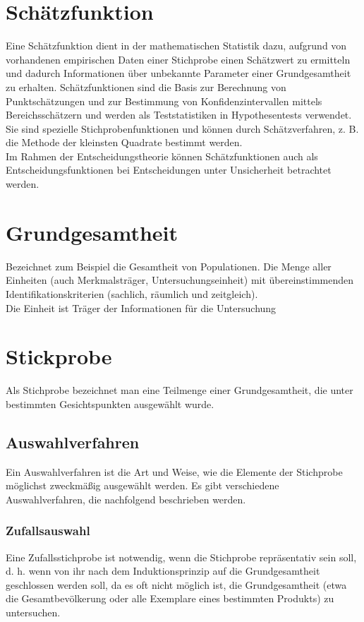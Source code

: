 \section{Schätzfunktion}
Eine Schätzfunktion dient in der mathematischen Statistik dazu, aufgrund von vorhandenen empirischen Daten einer Stichprobe einen Schätzwert zu ermitteln und dadurch Informationen über unbekannte Parameter einer Grundgesamtheit zu erhalten. Schätzfunktionen sind die Basis zur Berechnung von Punktschätzungen und zur Bestimmung von Konfidenzintervallen mittels Bereichsschätzern und werden als Teststatistiken in Hypothesentests verwendet. Sie sind spezielle Stichprobenfunktionen und können durch Schätzverfahren, z. B. die Methode der kleinsten Quadrate  bestimmt werden.\\
Im Rahmen der Entscheidungstheorie können Schätzfunktionen auch als Entscheidungsfunktionen bei Entscheidungen unter Unsicherheit betrachtet werden.

\section{Grundgesamtheit}
Bezeichnet zum Beispiel die Gesamtheit von Populationen.
Die Menge aller Einheiten (auch Merkmalsträger, Untersuchungseinheit) mit übereinstimmenden Identifikationskriterien
(sachlich, räumlich und zeitgleich). \\
Die Einheit ist Träger der Informationen für die Untersuchung

\section{Stickprobe}
Als Stichprobe bezeichnet man eine Teilmenge einer Grundgesamtheit, die unter bestimmten Gesichtspunkten ausgewählt wurde.
\subsection{Auswahlverfahren}
Ein Auswahlverfahren ist die Art und Weise, wie die Elemente der Stichprobe möglichst zweckmäßig ausgewählt werden. Es gibt verschiedene Auswahlverfahren, die nachfolgend beschrieben werden.
\subsubsection{Zufallsauswahl}
Eine Zufallsstichprobe ist notwendig, wenn die Stichprobe repräsentativ sein soll, d. h. wenn von ihr nach dem Induktionsprinzip auf die Grundgesamtheit geschlossen werden soll, da es oft nicht möglich ist, die Grundgesamtheit (etwa die Gesamtbevölkerung oder alle Exemplare eines bestimmten Produkts) zu untersuchen.
